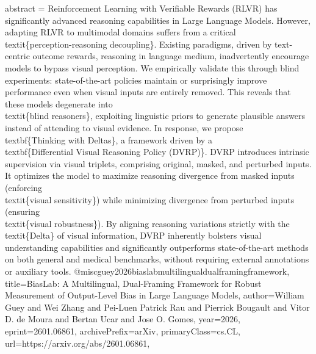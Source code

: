 {      abstract = {Reinforcement Learning with Verifiable Rewards (RLVR) has significantly advanced reasoning capabilities in Large Language Models. However, adapting RLVR to multimodal domains suffers from a critical \\textit\{perception-reasoning decoupling\}. Existing paradigms, driven by text-centric outcome rewards, reasoning in language medium, inadvertently encourage models to bypass visual perception. We empirically validate this through blind experiments: state-of-the-art policies maintain or surprisingly improve performance even when visual inputs are entirely removed. This reveals that these models degenerate into \\textit\{blind reasoners\}, exploiting linguistic priors to generate plausible answers instead of attending to visual evidence. In response, we propose \\textbf\{Thinking with Deltas\}, a framework driven by a \\textbf\{Differential Visual Reasoning Policy (DVRP)\}. DVRP introduces intrinsic supervision via visual triplets, comprising original, masked, and perturbed inputs. It optimizes the model to maximize reasoning divergence from masked inputs (enforcing \\textit\{visual sensitivity\}) while minimizing divergence from perturbed inputs (ensuring \\textit\{visual robustness\}). By aligning reasoning variations strictly with the \\textit\{Delta\} of visual information, DVRP inherently bolsters visual understanding capabilities and significantly outperforms state-of-the-art methods on both general and medical benchmarks, without requiring external annotations or auxiliary tools.}
}@misc{guey2026biaslabmultilingualdualframingframework,
      title={BiasLab: A Multilingual, Dual-Framing Framework for Robust Measurement of Output-Level Bias in Large Language Models}, 
      author={William Guey and Wei Zhang and Pei-Luen Patrick Rau and Pierrick Bougault and Vitor D. de Moura and Bertan Ucar and Jose O. Gomes},
      year={2026},
      eprint={2601.06861},
      archivePrefix={arXiv},
      primaryClass={cs.CL},
      url={https://arxiv.org/abs/2601.06861},
}
